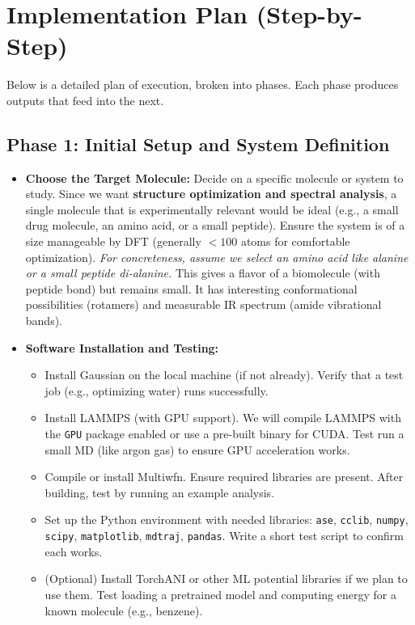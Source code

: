 \documentclass[11pt]{article}
\begin{document}
\section{Implementation Plan (Step-by-Step)}
Below is a detailed plan of execution, broken into phases. Each phase produces outputs that feed into the next.

\subsection*{Phase 1: Initial Setup and System Definition}
\begin{itemize}
  \item \textbf{Choose the Target Molecule:} Decide on a specific molecule or system to study. Since we want \textbf{structure optimization and spectral analysis}, a single molecule that is experimentally relevant would be ideal (e.g., a small drug molecule, an amino acid, or a small peptide). Ensure the system is of a size manageable by DFT (generally $<100$ atoms for comfortable optimization). \emph{For concreteness, assume we select an amino acid like \*alanine\* or a small peptide di-alanine.} This gives a flavor of a biomolecule (with peptide bond) but remains small. It has interesting conformational possibilities (rotamers) and measurable IR spectrum (amide vibrational bands).
  \item \textbf{Software Installation and Testing:}
  \begin{itemize}
    \item Install Gaussian on the local machine (if not already). Verify that a test job (e.g., optimizing water) runs successfully.
    \item Install LAMMPS (with GPU support). We will compile LAMMPS with the \texttt{GPU} package enabled or use a pre-built binary for CUDA. Test run a small MD (like argon gas) to ensure GPU acceleration works.
    \item Compile or install Multiwfn. Ensure required libraries are present. After building, test by running an example analysis.
    \item Set up the Python environment with needed libraries: \texttt{ase}, \texttt{cclib}, \texttt{numpy}, \texttt{scipy}, \texttt{matplotlib}, \texttt{mdtraj}, \texttt{pandas}. Write a short test script to confirm each works.
    \item (Optional) Install TorchANI or other ML potential libraries if we plan to use them. Test loading a pretrained model and computing energy for a known molecule (e.g., benzene).

\end{itemize}
\end{itemize}
\end{document}
